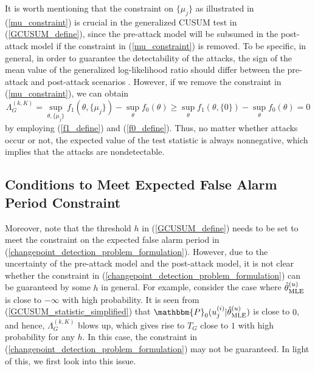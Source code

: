 \documentclass[11pt, draftclsnofoot, onecolumn]{IEEEtran}
\newcommand{\bbP}{\mathbbm{P}}
\begin{document}
It is worth mentioning that the constraint on $\{\mu_j \}$ as illustrated in (\ref{mu_constraint}) is crucial in the generalized CUSUM test in (\ref{GCUSUM_define}), since the pre-attack model will be subsumed in the post-attack model if the constraint in (\ref{mu_constraint}) is removed. To be specific, in general, in order to guarantee the detectability of the attacks, the sign of the mean value of the generalized log-likelihood ratio should differ between the pre-attack and post-attack scenarios \cite{basseville1993detection, tartakovsky2014sequential}. However, if we remove the constraint in (\ref{mu_constraint}),  we can obtain  
\begin{equation}
\Lambda _G^{(k,K)} = \mathop {\sup }\limits_{\theta ,\{ {\mu _j} \} } {f_1}\left( {\theta ,\{ {\mu _j}\} } \right) - \mathop {\sup }\limits_\theta  {f_0}\left( {\theta } \right) \ge \mathop {\sup }\limits_{\theta  } {f_1}\left( {\theta ,\{ 0\} } \right) - \mathop {\sup }\limits_\theta  {f_0}\left( {\theta } \right) = 0
\end{equation}
by employing (\ref{f1_define}) and (\ref{f0_define}). Thus, no matter whether attacks occur or not, the expected value of the test statistic is always nonnegative, which implies that the attacks are nondetectable.



\subsection{Conditions to Meet Expected False Alarm Period Constraint}

Moreover, note that the threshold $h$ in (\ref{GCUSUM_define}) needs to be set to meet the constraint on the expected false alarm period in (\ref{changepoint_detection_problem_formulation}). However, due to the uncertainty of the pre-attack model and the post-attack model, it is not clear whether the constraint in (\ref{changepoint_detection_problem_formulation}) can be guaranteed by some $h$ in general. For example, consider the case where $\hat \theta _{{\rm{MLE}}}^{(u)}$ is close to $-\infty$ with high probability. It is seen from (\ref{GCUSUM_statistic_simplified}) that 
${{{\bbP_0}( {u_j^{(i)}| {\hat \theta _{{\rm{MLE}}}^{(u)}} } )}}$ is close to $0$, and hence, $\Lambda _G^{(k,K)}$ blows up, which gives rise to $T_G$ close to $1$ with high probability for any $h$. In this case, the constraint in (\ref{changepoint_detection_problem_formulation}) may not be guaranteed. In light of this, we first look into this issue.
\end{document}
